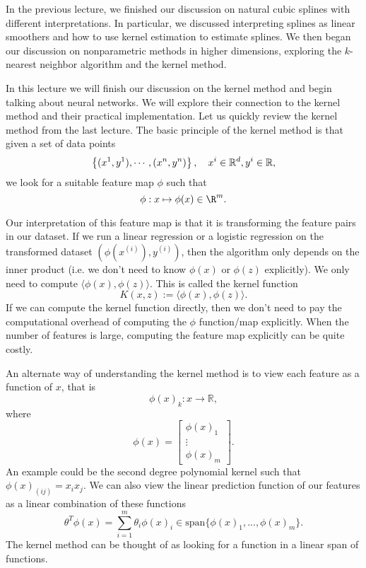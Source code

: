
\setcounter{section}{0}





In the previous lecture, we finished our discussion on natural cubic splines with different interpretations. In particular, we discussed interpreting splines as linear smoothers and how to use kernel estimation to estimate splines. We then began our discussion on nonparametric methods in higher dimensions, exploring the $k$-nearest neighbor algorithm and the kernel method. 

In this lecture we will finish our discussion on the kernel method and begin talking about neural networks. We will explore their connection to the kernel method and their practical implementation. 
Let us quickly review the kernel method from the last lecture. The basic principle of the kernel method is that given a set of data points
$$
\left\{(x\sp{1}, y\sp{1}), \cdots,  (x\sp{n}, y\sp{n})\right\}, \quad x\sp{i} \in \mathbb{R}^d, y\sp{i} \in \mathbb{R},
$$
we look for a suitable feature map $\phi$ such that
$$
\phi: x \mapsto \phi(x) \in \R^m.
$$

Our interpretation of this feature map is that it is transforming the feature pairs in our dataset. If we run a linear regression or a logistic regression on the transformed dataset $(\phi(x^{(i)}), y^{(i)})$, then the algorithm only depends on the inner product (i.e. we don't need to know $\phi(x)$ or $\phi(z)$ explicitly). We only need to compute $\langle \phi(x) , \phi(z) \rangle$. This is called the kernel function
\begin{equation}
K(x,z):=	\langle \phi(x) , \phi(z) \rangle.
\end{equation}
If we can compute the kernel function directly, then we don't need to pay the computational overhead of computing the $\phi$ function/map explicitly. When the number of features is large, computing the feature map explicitly can be quite costly. 

An alternate way of understanding the kernel method is to view each feature as a function of $x$, that is
$$
\phi(x)_k : x \rightarrow \mathbb{R},
$$
where
$$
\phi(x) = \begin{bmatrix}
	\phi(x)_1 \\
	\vdots \\
	\phi(x)_m
\end{bmatrix}.
$$
An example could be the second degree polynomial kernel such that $\phi(x)_{(ij)} = x_i x_j$. We can also view the linear prediction function of our features as a linear combination of these functions 
$$
\theta^T \phi(x) = \sum_{i=1}^{m} \theta_i \phi(x)_i \in \mbox{span}\{ \phi(x)_1, ..., \phi(x)_m \}.
$$
The kernel method can be thought of as looking for a function in a linear span of functions. 

